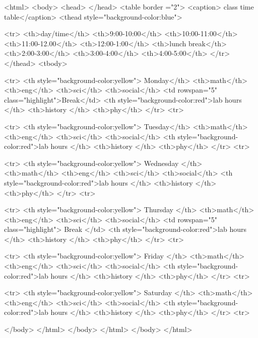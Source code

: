 <html>
<body>
<head>
</head>
<table border ="2">
<caption> class time table</caption>
<thead style="background-color:blue">

<tr>
<th>day/time</th>
<th>9:00-10:00</th>
<th>10:00-11:00</th>
<th>11:00-12.00</th>
<th>12:00-1:00</th>
<th>lunch break</th>
<th>2:00-3:00</th>
<th>3:00-4:00</th>
<th>4:00-5:00</th>
</tr>
</thead>
<tbody>

<tr>
<th style="background-color:yellow"> Monday</th>
<th>math</th>
<th>eng</th>
<th>sci</th>
<th>social</th>
<td rowspan="5" class="highlight">Break</td>
<th style="background-color:red">lab hours </th>
<th>history </th>
<th>phy</th>
</tr>
<tr>


<tr>
<th style="background-color:yellow"> Tuesday</th>
<th>math</th>
<th>eng</th>
<th>sci</th>
<th>social</th>
<th style="background-color:red">lab hours </th>
<th>history </th>
<th>phy</th>
</tr>
<tr>

<tr>
<th style="background-color:yellow"> Wednesday </th>
<th>math</th>
<th>eng</th>
<th>sci</th>
<th>social</th>
<th style="background-color:red">lab hours </th>
<th>history </th>
<th>phy</th>
</tr>
<tr>


<tr>
<th style="background-color:yellow"> Thursday </th>
<th>math</th>
<th>eng</th>
<th>sci</th>
<th>social</th>
<td rowspan="5" class="highlight"> Break </td>
<th style="background-color:red">lab hours </th>
<th>history </th>
<th>phy</th>
</tr>
<tr>


<tr>
<th style="background-color:yellow"> Friday </th>
<th>math</th>
<th>eng</th>
<th>sci</th>
<th>social</th>
<th style="background-color:red">lab hours </th>
<th>history </th>
<th>phy</th>
</tr>
<tr>


<tr>
<th style="background-color:yellow"> Saturday </th>
<th>math</th>
<th>eng</th>
<th>sci</th>
<th>social</th>
<th style="background-color:red">lab hours </th>
<th>history </th>
<th>phy</th>
</tr>
<tr>


</body>
</html>
</body>
</html>
</body>
</html>
